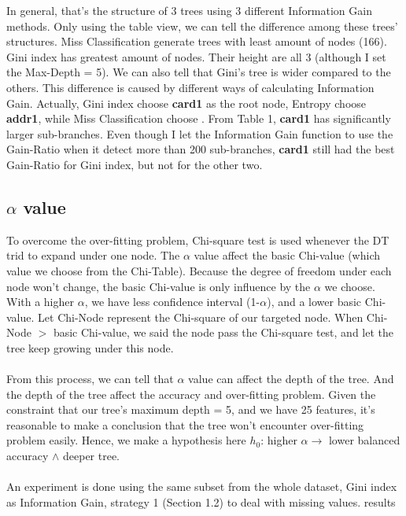 \documentclass{article}
\begin{document}
In general, that's the structure of 3 trees using 3 different Information Gain methods. Only using the table view, we can tell the difference among these trees' structures. Miss Classification generate trees with least amount of nodes (166). Gini index has greatest amount of nodes. Their height are all 3 (although I set the Max-Depth = 5). We can also tell that Gini's tree is wider compared to the others. This difference is caused by different ways of calculating Information Gain. Actually, Gini index choose \textbf{card1} as the root node, Entropy choose \textbf{addr1}, while Miss Classification choose . From Table 1, \textbf{card1} has significantly larger sub-branches. Even though I let the Information Gain function to use the Gain-Ratio when it detect more than 200 sub-branches, \textbf{card1} still had the best Gain-Ratio for Gini index, but not for the other two. 



\subsection{$\alpha$ value}

To overcome the over-fitting problem, Chi-square test is used whenever the DT trid to expand under one node. The $\alpha$ value affect the basic Chi-value (which value we choose from the Chi-Table). Because the degree of freedom under each node won't change, the basic Chi-value is only influence by the $\alpha$ we choose. With a higher $\alpha$, we have less confidence interval (1-$\alpha$), and a lower basic Chi-value. Let Chi-Node represent the Chi-square of our targeted node. When Chi-Node $>$ basic Chi-value, we said the node pass the Chi-square test, and let the tree keep growing under this node.\\\\
From this process, we can tell that $\alpha$ value can affect the depth of the tree. And the depth of the tree affect the accuracy and over-fitting problem. Given the constraint that our tree's maximum depth = 5, and we have 25 features, it's reasonable to make a conclusion that the tree won't encounter over-fitting problem easily. Hence, we make a hypothesis here $h_0$: higher $\alpha \rightarrow$ lower balanced accuracy $\land$ deeper tree.\\\\
An experiment is done using the same subset from the whole dataset, Gini index as Information Gain, strategy 1  (Section 1.2) to deal with missing values. results 
\end{document}
